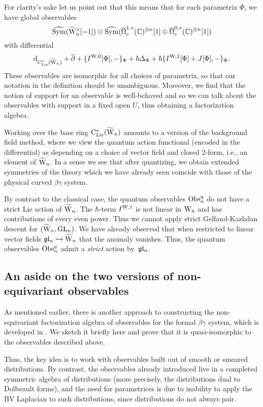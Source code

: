 For clarity's sake let us point out that this means that for each parametrix $\Phi$, we have global observables
\[
\widehat{{\rm Sym}}(\widetilde{{{\rm W}}}_n^\vee[-1]) \otimes \widehat{{\rm Sym}}(\overline{\Omega}^{1,*}_c(\mathbb C)^{\oplus n}[1] \oplus \overline{\Omega}^{0,*}_c(\mathbb C)^{\oplus n}[1])
\]
with differential 
\[
{\rm d}_{{\rm C}_{\rm Lie}^*(\widetilde{{{\rm W}}}_n)} + \overline{\partial} + \{I^{{\rm W},0}[\Phi],-\}_\Phi + \hbar \Delta_\Phi + \hbar \{I^{{\rm W},1}[\Phi]+J[\Phi],-\}_\Phi.
\]
These observables are isomorphic for all choices of parametrix,
so that our notation in the definition should be unambiguous.
Moreover, we find that the notion of support for an observable is well-behaved 
and so we can talk about the observables with support in a fixed open $U$,
thus obtaining a factorization algebra.

\begin{rmk}
Working over the base ring ${\rm C}_{\rm Lie}^*(\widetilde{{{\rm W}}}_n)$ amounts to a version of the background field method,
where we view the quantum action functional (encoded in the differential) as depending on a choice of vector field and closed 2-form,
i.e., an element of $\widetilde{{{\rm W}}}_n$.
In a sense we see that after quantizing, we obtain extended symmetries
of the theory which we have already seen coincide with those of the
physical curved $\beta\gamma$ system.
\end{rmk}

By contrast to the classical case, the quantum observables ${\rm Obs}^{\rm q}_n$ do not have a strict Lie action of $\widetilde{{{\rm W}}}_n$.
The $\hbar$-term $I^{{\rm W},1}$ is not linear in ${{\rm W}_n}$ and has
contributions of every even power.
Thus we cannot apply strict Gelfand-Kazhdan descent for
$(\widetilde{{{\rm W}}}_n,{\rm GL}_n)$. We have already observed that when restricted to
linear vector fields $\mathfrak{g} \mathfrak{l}_n \hookrightarrow \widetilde{{{\rm W}}}_n$ that the anomaly
vanishes. Thus, the quantum observables ${\rm Obs}^q_n$ admit a {\it strict} action by~$\mathfrak{g} \mathfrak{l}_n$.

\subsection{An aside on the two versions of non-equivariant observables}
\label{noneqsec}

As mentioned earlier, there is another approach to constructing the non-equivariant factorization algebra of observables
for the formal $\beta\gamma$ system, which is developed in \cite{CG1}.
We sketch it briefly here and prove that it is quasi-isomorphic to the observables described above.

Thus, the key idea is to work with observables built out of smooth or smeared distributions.
By contrast, the observables already introduced live in a completed symmetric algebra of distributions 
(more precisely, the distributions dual to Dolbeault forms),
and the need for parametrices is due to inability to apply the BV Laplacian to such distributions,
since distributions do not always pair.

